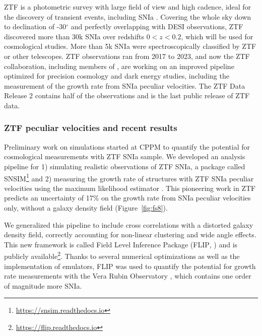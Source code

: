   ZTF is a photometric survey with large field of view and high cadence, ideal for the 
  discovery of transient events, including SNIa 
  \cite{bellmZwickyTransientFacility2019}.
  Covering the whole sky down to declination of -30$^\circ$ 
  and perfectly overlapping with DESI observations, 
  ZTF discovered more than 30k SNIa over redshifts $0 < z < 0.2$, 
  which will be used for cosmological studies. 
  More than 5k SNIa were spectroscopically
  classified by ZTF or other telescopes. 
  ZTF observations ran from 2017 to 2023, 
  and now the ZTF collaboration, including members of \projacro, are working on 
  an improved pipeline optimized for precision cosmology and dark energy studies, 
  including the measurement of the growth rate from SNIa peculiar velocities.  
  The ZTF Data Release 2 \cite{rigaultZTFSNIa2025} contains half of the observations
  and is the last public release of ZTF data.

\subsubsection*{ZTF peculiar velocities and recent results}

  Preliminary work on simulations started at CPPM to quantify the potential 
  for cosmological measurements with ZTF SNIa sample. 
  We developed an analysis
  pipeline for 1) simulating realistic observations of ZTF SNIa, a package 
  called \textsc{SNSIM}\footnote{\url{https://snsim.readthedocs.io}} and 2) 
  measuring the growth rate of structures with ZTF SNIa peculiar velocities 
  using the maximum likelihood estimator
  \cite{carreresGrowthrateMeasurementTypeIa2023}. This pioneering work 
  in ZTF predicts an uncertainty of 17\% on the growth rate 
  from SNIa peculiar velocities only, without a galaxy density field 
  (Figure~\ref{fig:fs8}). 

  We generalized this pipeline to include cross correlations 
  with a distorted galaxy density field, correctly accounting for non-linear clustering 
  and wide angle effects. This new framework is called Field Level Inference Package 
  (\textsc{FLIP}, \cite{ravouxGeneralizedFrameworkLikelihoodbased2025}) and is publicly 
  available\footnote{\url{https://flip.readthedocs.io}}.
  Thanks to several numerical optimizations as well as the implementation of emulators, 
  FLIP was used to quantify the potential for growth rate measurements 
  with the Vera Rubin Observatory \cite{rosselliForecastGrowthrateMeasurement2025},
  which contains one order of magnitude more SNIa. 

